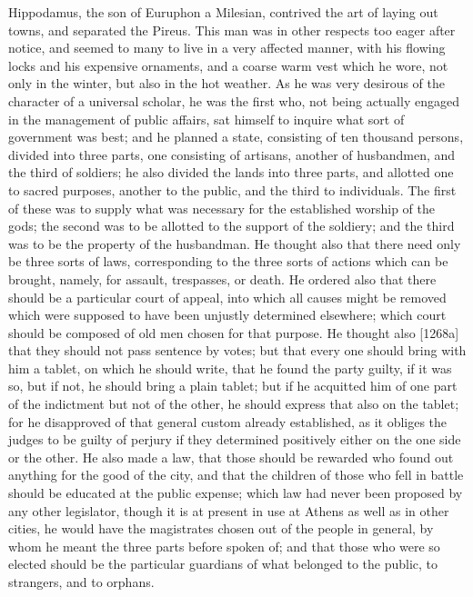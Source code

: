 
Hippodamus, the son of Euruphon a Milesian, contrived the art of laying
out towns, and separated the Pireus. This man was in other respects too
eager after notice, and seemed to many to live in a very affected manner,
with his flowing locks and his expensive ornaments, and a coarse warm vest
which he wore, not only in the winter, but also in the hot weather. As he
was very desirous of the character of a universal scholar, he was the
first who, not being actually engaged in the management of public affairs,
sat himself to inquire what sort of government was best; and he planned a
state, consisting of ten thousand persons, divided into three parts, one
consisting of artisans, another of husbandmen, and the third of soldiers;
he also divided the lands into three parts, and allotted one to sacred
purposes, another to the public, and the third to individuals. The first
of these was to supply what was necessary for the established worship of
the gods; the second was to be allotted to the support of the soldiery;
and the third was to be the property of the husbandman. He thought also
that there need only be three sorts of laws, corresponding to the three
sorts of actions which can be brought, namely, for assault, trespasses, or
death. He ordered also that there should be a particular court of appeal,
into which all causes might be removed which were supposed to have been
unjustly determined elsewhere; which court should be composed of old men
chosen for that purpose. He thought also [1268a] that they should not pass
sentence by votes; but that every one should bring with him a tablet, on
which he should write, that he found the party guilty, if it was so, but
if not, he should bring a plain tablet; but if he acquitted him of one
part of the indictment but not of the other, he should express that also
on the tablet; for he disapproved of that general custom already
established, as it obliges the judges to be guilty of perjury if they
determined positively either on the one side or the other. He also made a
law, that those should be rewarded who found out anything for the good of
the city, and that the children of those who fell in battle should be
educated at the public expense; which law had never been proposed by any
other legislator, though it is at present in use at Athens as well as in
other cities, he would have the magistrates chosen out of the people in
general, by whom he meant the three parts before spoken of; and that those
who were so elected should be the particular guardians of what belonged to
the public, to strangers, and to orphans.

